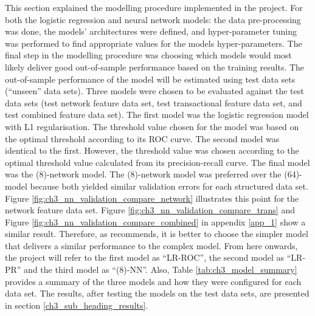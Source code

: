 This section explained the modelling procedure implemented in the project. For both the logistic regression and neural network models: the data pre-processing was done, the models' architectures were defined, and hyper-parameter tuning was performed to find appropriate values for the models hyper-parameters. The final step in the modelling procedure was choosing which models would most likely deliver good out-of-sample performance based on the training results. The out-of-sample performance of the model will be estimated using test data sets (``unseen'' data sets). Three models were chosen to be evaluated against the test data sets (test network feature data set, test transactional feature data set, and test combined feature data set). The first model was the logistic regression model with L1 regularisation. The threshold value chosen for the model was based on the optimal threshold according to its ROC curve. The second model was identical to the first. However, the threshold value was chosen according to the optimal threshold value calculated from its precision-recall curve. The final model was the (8)-network model. The (8)-network model was preferred over the (64)-model because both yielded similar validation errors for each structured data set. Figure \ref{fig:ch3_nn_validation_compare_network} illustrates this point for the network feature data set. Figure \ref{fig:ch3_nn_validation_compare_trans} and Figure \ref{fig:ch3_nn_validation_compare_combined} in appendix \ref{app_1} show a similar result. Therefore, as \citet{james2013introduction} recommends, it is better to choose the simpler model that delivers a similar performance to the complex model. From here onwards, the project will refer to the first model as ``LR-ROC'', the second model as ``LR-PR'' and the third model as ``(8)-NN''. Also, Table \ref{tab:ch3_model_summary} provides a summary of the three models and how they were configured for each data set. The results, after testing the models on the test data sets, are presented in section \ref{ch3_sub_heading_results}.

